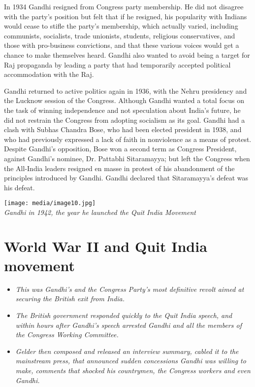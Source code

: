 In 1934 Gandhi resigned from Congress party membership. He did not
disagree with the party's position but felt that if he resigned, his
popularity with Indians would cease to stifle the party's membership,
which actually varied, including communists, socialists, trade
unionists, students, religious conservatives, and those with
pro-business convictions, and that these various voices would get a
chance to make themselves heard. Gandhi also wanted to avoid being a
target for Raj propaganda by leading a party that had temporarily
accepted political accommodation with the Raj.

Gandhi returned to active politics again in 1936, with the Nehru
presidency and the Lucknow session of the Congress. Although Gandhi
wanted a total focus on the task of winning independence and not
speculation about India's future, he did not restrain the Congress from
adopting socialism as its goal. Gandhi had a clash with Subhas Chandra
Bose, who had been elected president in 1938, and who had previously
expressed a lack of faith in nonviolence as a means of protest. Despite
Gandhi's opposition, Bose won a second term as Congress President,
against Gandhi's nominee, Dr. Pattabhi Sitaramayya; but left the
Congress when the All-India leaders resigned en masse in protest of his
abandonment of the principles introduced by Gandhi. Gandhi declared that
Sitaramayya's defeat was his defeat.

\texttt{[image: media/image10.jpg]}\\
\emph{Gandhi in 1942, the year he launched the Quit India Movement}

\section{World War II and Quit India
movement}\label{world-war-ii-and-quit-india-movement}

\begin{itemize}
\item
  \emph{This was Gandhi's and the Congress Party's most definitive
  revolt aimed at securing the British exit from India.}
\item
  \emph{The British government responded quickly to the Quit India
  speech, and within hours after Gandhi's speech arrested Gandhi and all
  the members of the Congress Working Committee.}
\item
  \emph{Gelder then composed and released an interview summary, cabled
  it to the mainstream press, that announced sudden concessions Gandhi
  was willing to make, comments that shocked his countrymen, the
  Congress workers and even Gandhi.}
\end{itemize}

